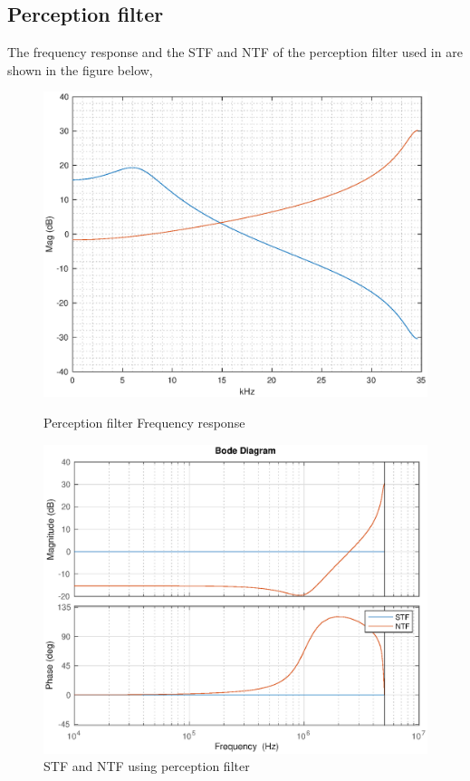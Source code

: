 \documentclass[a4paper]{article}
\begin{document}
\subsection{Perception filter}
The  frequency response and the STF and NTF of the perception filter used in  
\cite{goodwin2003moving} are shown in the
figure below, 
\begin{figure}[!h]
	\centering
\begin{minipage}{0.45\linewidth}
	\centering
	\includegraphics[scale = 0.45]{plots/percp.eps}
        \caption{Perception filter Frequency response}
	\end{minipage}
	\hfil
	\begin{minipage}{0.45\linewidth}
	\centering
	\includegraphics[scale = 0.45]{plots/stf_ntf_perception_linear.eps}
		\caption{STF and NTF using perception filter}
\end{minipage}
\end{figure}
\end{document}
